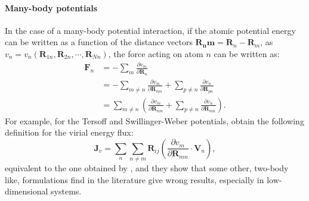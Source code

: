 \begin{LEtext}
\paragraph{Many-body potentials}
In the case of a many-body potential interaction, if the atomic potential energy can be written as a function of the distance vectors $\mathbf{R_nm}=\mathbf{R}_n-\mathbf{R}_m$, as $v_n = v_n(\mathbf{R}_{1n},\mathbf{R}_{2n},\cdots,\mathbf{R}_{Nn})$, the force acting on atom $n$ can be written as: \cite{Fan2015,Hardy2016}
\begin{align}
    \mathbf{F}_n &= -\sum_m \frac{\partial v_m}{\partial \mathbf{R}_n} \\
        &= -\sum_{m\neq n} \frac{\partial v_m}{\partial \mathbf{R}_{nm}} + \sum_{p\neq n} \frac{\partial v_n}{\partial \mathbf{R}_{pn}} \\
        &= \sum_{m\neq n} \left(\frac{\partial v_m}{\partial \mathbf{R}_{nm}} + \sum_{p\neq n} \frac{\partial v_n}{\partial \mathbf{R}_{mn}} \right).
\end{align}
For example, for the Tersoff \cite{Tersoff1989} and Swillinger-Weber \cite{Stillinger1985} potentials, \citeauthor{Fan2015} obtain the following definition for the virial energy flux:
\begin{equation}
    \mathbf{J}_v = \sum_n \sum_{n\neq m} \mathbf{R}_{ij} \left(\frac{\partial v_m}{\partial \mathbf{R}_{mn}} \cdot \mathbf{V}_n \right) ,
\end{equation}
equivalent to the one obtained by \citet{Hardy1963}, and they show that some other, two-body like, formulations find in the literature give wrong results, especially in low-dimensional systems.

\end{LEtext}


